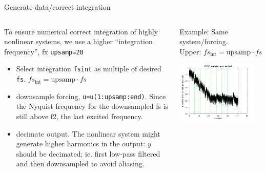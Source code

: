 \documentclass[9pt]{beamer}
\begin{document}
\begin{frame}{Generate data/correct integration}
  \begin{columns}
    \begin{column}{0.5\textwidth}
      To ensure numerical correct integration of highly nonlinear systems, we
      use a higher ``integration frequency'', fx \texttt{upsamp=20}
      \begin{itemize}
      \item Select integration \texttt{fsint} as multiple of desired \texttt{fs}.
        $fs_\text{int} =\text{upsamp} \cdot fs$
      \item downsample forcing, \texttt{u=u(1:upsamp:end)}. Since the Nyquist
        frequency for the downsampled fs is still above f2, the last excited
        frequency.
      \item decimate output. The nonlinear system might generate higher
        harmonics in the output: $y$ should be decimated; ie. first low-pass
        filtered and then downsampled to avoid aliasing.
      \end{itemize}
    \end{column}
    \begin{column}{0.5\textwidth}  %
      Example: Same system/forcing.\\ Upper: $fs_\text{int} =\text{upsamp}\cdot fs$
      \begin{center}
        \includegraphics[width=0.9\textwidth]{fig/b1_A30_ms_full1_periodicity}

\end{center}
\end{column}
\end{columns}
\end{frame}
\end{document}
